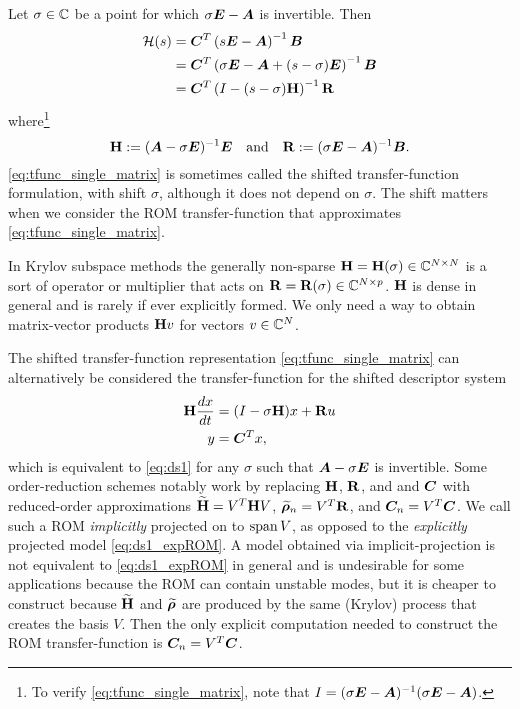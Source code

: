  Let $\sigma\in\mathbb{C}$ be a point for which $\sigma \bm{E}-\bm{A}$ is invertible. Then
        \begin{align}
                        \mathcal{H}(s) &= \bm{C}^T\left(s\bm{E}-\bm{A}\right)^{-1}\bm{B}\nonumber\\
					&= \bm{C}^T\left(\sigma \bm{E} - \bm{A} + (s-\sigma)\bm{E}\right)^{-1}\bm{B}\nonumber\\
                                &= \bm{C}^T\left(I-(s-\sigma)\textbf{\textup{H}}\right)^{-1}\textbf{\textup{R}} 
        \label{eq:tfunc_single_matrix}
        \end{align}
        where\footnote{To verify \eqref{eq:tfunc_single_matrix}, note that $I=(\sigma \bm{E} - \bm{A})^{-1}(\sigma \bm{E} - \bm{A})$.}
        \begin{equation}
                        \textbf{\textup{H}} := (\bm{A} - \sigma \bm{E})^{-1}\bm{E}\quad\textrm{and}\quad \textbf{\textup{R}} := (\sigma \bm{E}-\bm{A})^{-1}\bm{B}.        
        \label{eq:singlematrixdefs}
        \end{equation}
  \eqref{eq:tfunc_single_matrix} is sometimes called the shifted transfer-function formulation, with shift $\sigma$, although it does not depend on $\sigma$.   The shift matters when we consider the ROM transfer-function that approximates \eqref{eq:tfunc_single_matrix}.

 In Krylov subspace methods the generally non-sparse $\textbf{\textup{H}} = \textbf{\textup{H}}(\sigma)\in\mathbb{C}^{N\times N}$ is a sort of operator or multiplier that acts on $\textbf{\textup{R}}=\textbf{\textup{R}}(\sigma)\in\mathbb{C}^{N \times p}$.    $\textbf{\textup{H}}$ is dense in general and is rarely if ever explicitly formed.  We only need a way to obtain matrix-vector products $\textbf{\textup{H}} v$ for vectors $v\in\mathbb{C}^N$. 

The shifted transfer-function representation \eqref{eq:tfunc_single_matrix} can alternatively be considered the transfer-function for the shifted descriptor system
 \begin{equation}
         \begin{aligned}
                \textbf{\textup{H}} \frac{dx}{dt} &= (I - \sigma \textbf{\textup{H}}) x + \textbf{\textup{R}} u\\
                y &= \bm{C}^T x,
        \end{aligned}
        \label{eq:ds1_shifted}
        \end{equation}   
which is equivalent to \eqref{eq:ds1} for any $\sigma$ such that $\bm{A} - \sigma \bm{E}$ is invertible.  Some order-reduction schemes notably  work by replacing $\textbf{\textup{H}}$, $\textbf{\textup{R}}$, and and $\bm{C}$ with reduced-order approximations $\widetilde{\textbf{\textup{H}}} = V^T \textbf{\textup{H}} V$, $\widetilde{\boldsymbol{\rho}}_n = V^T \textbf{\textup{R}}$, and $\bm{C}_n = V^T \bm{C}$.    We call such a ROM \emph{implicitly} projected on to $\operatorname*{span} V$, as opposed to the \emph{explicitly} projected model \eqref{eq:ds1_expROM}.   A model obtained via implicit-projection is not equivalent to \eqref{eq:ds1_expROM} in general and is undesirable for some applications because the ROM can contain unstable modes, but it is cheaper to construct because $\widetilde{\textbf{\textup{H}}}$ and $\widetilde{\boldsymbol{\rho}}$ are produced by the same (Krylov) process that creates the basis $V$.  Then the only explicit computation needed to construct the ROM transfer-function is  $\bm{C}_n = V^T \bm{C}$.
 
